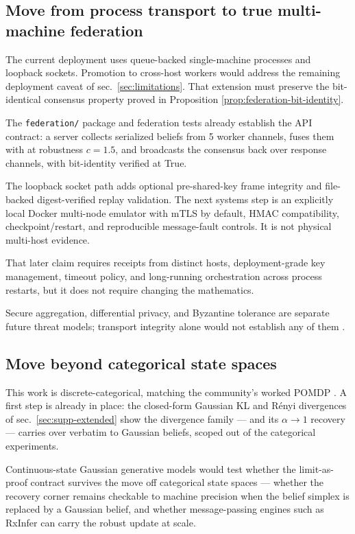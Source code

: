 \documentclass[
  english,
]{article}
\theoremstyle{plain}
\theoremstyle{definition}
\theoremstyle{remark}
\theoremstyle{definition}
\begin{document}
\subsection{Move from process transport to true multi-machine
federation}\label{sec:future-transport}

The current deployment uses queue-backed single-machine processes and
loopback sockets. Promotion to cross-host workers would address the
remaining deployment caveat of sec.~\ref{sec:limitations}. That
extension must preserve the bit-identical consensus property proved in
Proposition \ref{prop:federation-bit-identity}.

The \texttt{federation/} package and federation tests already establish
the API contract: a server collects serialized beliefs from 5 worker
channels, fuses them with  at robustness
\(c = 1.5\), and broadcasts the consensus back over response channels,
with bit-identity verified at True.

The loopback socket path adds optional pre-shared-key frame integrity
and file-backed digest-verified replay validation. The next systems step
is an explicitly local Docker multi-node emulator with mTLS by default,
HMAC compatibility, checkpoint/restart, and reproducible message-fault
controls. It is not physical multi-host evidence.

That later claim requires receipts from distinct hosts, deployment-grade
key management, timeout policy, and long-running orchestration across
process restarts, but it does not require changing the mathematics.

Secure aggregation, differential privacy, and Byzantine tolerance are
separate future threat models; transport integrity alone would not
establish any of them \citep{blanchard2017krum, pillutla2022robust}.

\subsection{Move beyond categorical state
spaces}\label{sec:future-continuous}

This work is discrete-categorical, matching the community's worked POMDP
\citep{dacosta2020active}. A first step is already in place: the
closed-form Gaussian KL and Rényi divergences of
sec.~\ref{sec:supp-extended} show the divergence family --- and its
\(\alpha\to1\) recovery --- carries over verbatim to Gaussian beliefs,
scoped out of the categorical experiments.

Continuous-state Gaussian generative models would test whether the
limit-as-proof contract survives the move off categorical state spaces
--- whether the recovery corner remains checkable to machine precision
when the belief simplex is replaced by a Gaussian belief, and whether
message-passing engines such as RxInfer \citep{bagaev2023rxinfer} can
carry the robust update at scale.
\end{document}
